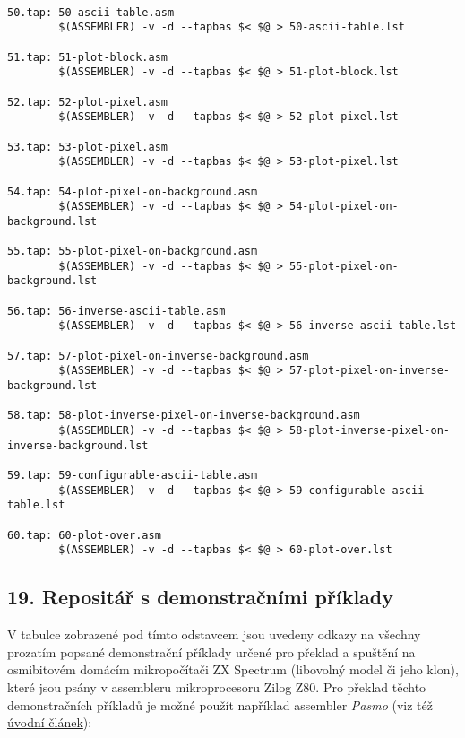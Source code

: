 \documentclass{article}
\begin{document}
\begin{verbatim}
 
50.tap: 50-ascii-table.asm
        $(ASSEMBLER) -v -d --tapbas $< $@ > 50-ascii-table.lst
 
51.tap: 51-plot-block.asm
        $(ASSEMBLER) -v -d --tapbas $< $@ > 51-plot-block.lst
 
52.tap: 52-plot-pixel.asm
        $(ASSEMBLER) -v -d --tapbas $< $@ > 52-plot-pixel.lst
 
53.tap: 53-plot-pixel.asm
        $(ASSEMBLER) -v -d --tapbas $< $@ > 53-plot-pixel.lst
 
54.tap: 54-plot-pixel-on-background.asm
        $(ASSEMBLER) -v -d --tapbas $< $@ > 54-plot-pixel-on-background.lst
 
55.tap: 55-plot-pixel-on-background.asm
        $(ASSEMBLER) -v -d --tapbas $< $@ > 55-plot-pixel-on-background.lst
 
56.tap: 56-inverse-ascii-table.asm
        $(ASSEMBLER) -v -d --tapbas $< $@ > 56-inverse-ascii-table.lst
 
57.tap: 57-plot-pixel-on-inverse-background.asm
        $(ASSEMBLER) -v -d --tapbas $< $@ > 57-plot-pixel-on-inverse-background.lst
 
58.tap: 58-plot-inverse-pixel-on-inverse-background.asm
        $(ASSEMBLER) -v -d --tapbas $< $@ > 58-plot-inverse-pixel-on-inverse-background.lst
 
59.tap: 59-configurable-ascii-table.asm
        $(ASSEMBLER) -v -d --tapbas $< $@ > 59-configurable-ascii-table.lst
 
60.tap: 60-plot-over.asm
        $(ASSEMBLER) -v -d --tapbas $< $@ > 60-plot-over.lst
\end{verbatim}

\hypertarget{k19}{%
\subsection{19. Repositář s demonstračními příklady}\label{k19}}

V tabulce zobrazené pod tímto odstavcem jsou uvedeny odkazy na všechny
prozatím popsané demonstrační příklady určené pro překlad a spuštění na
osmibitovém domácím mikropočítači ZX Spectrum (libovolný model či jeho
klon), které jsou psány v assembleru mikroprocesoru Zilog Z80. Pro
překlad těchto demonstračních příkladů je možné použít například
assembler \emph{Pasmo} (viz též
\href{https://www.root.cz/clanky/kouzlo-minimalismu-potreti-vyvoj-her-a-dem-pro-slavne-zx-spectrum/}{úvodní
článek}):
\end{document}
